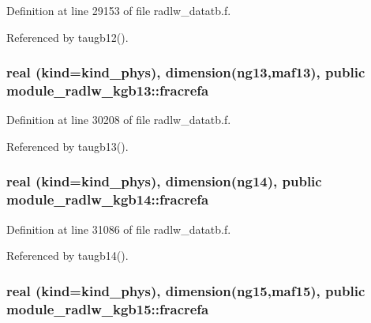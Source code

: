 Definition at line 29153 of file radlw\+\_\+datatb.\+f.



Referenced by taugb12().

\subsubsection[{\texorpdfstring{fracrefa}{fracrefa}}]{\setlength{\rightskip}{0pt plus 5cm}real (kind=kind\+\_\+phys), dimension(ng13,maf13), public module\+\_\+radlw\+\_\+kgb13\+::fracrefa}\hypertarget{group__module__radlw__main_ga82aed8a05cd528b287e336f7ff8fcebb}{}\label{group__module__radlw__main_ga82aed8a05cd528b287e336f7ff8fcebb}


Definition at line 30208 of file radlw\+\_\+datatb.\+f.



Referenced by taugb13().

\subsubsection[{\texorpdfstring{fracrefa}{fracrefa}}]{\setlength{\rightskip}{0pt plus 5cm}real (kind=kind\+\_\+phys), dimension(ng14), public module\+\_\+radlw\+\_\+kgb14\+::fracrefa}\hypertarget{group__module__radlw__main_gae1e7065b9ea30b36a3665ad594545e9b}{}\label{group__module__radlw__main_gae1e7065b9ea30b36a3665ad594545e9b}


Definition at line 31086 of file radlw\+\_\+datatb.\+f.



Referenced by taugb14().

\subsubsection[{\texorpdfstring{fracrefa}{fracrefa}}]{\setlength{\rightskip}{0pt plus 5cm}real (kind=kind\+\_\+phys), dimension(ng15,maf15), public module\+\_\+radlw\+\_\+kgb15\+::fracrefa}\hypertarget{group__module__radlw__main_ga4b5c5f6fd9ea806843adf78ec1b43cd2}{}\label{group__module__radlw__main_ga4b5c5f6fd9ea806843adf78ec1b43cd2}


